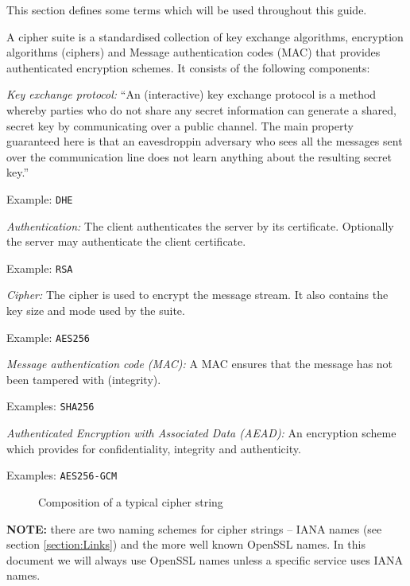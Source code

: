 
This section defines some terms which will be used throughout this guide.


A cipher suite is a standardised collection of key exchange algorithms, encryption 
algorithms (ciphers) and Message authentication codes (MAC) that provides authenticated 
encryption schemes. It consists of the following components:

\begin{description}

\item{\it Key exchange protocol:}
``An (interactive) key exchange protocol is a method whereby parties who do not 
share any secret information can generate a shared, secret key by communicating 
over a public channel. The main property guaranteed here is that an 
eavesdroppin adversary who sees all the messages sent over the communication 
line does not learn anything about the resulting secret key.'' \cite{katz2008introduction}

Example: \texttt{DHE}

\item{\it Authentication:}
The client authenticates the server by its certificate. Optionally the server 
may authenticate the client certificate.

Example: \texttt{RSA}

\item{\it Cipher:}
The cipher is used to encrypt the message stream. It also contains the key size
and mode used by the suite.

Example: \texttt{AES256}

\item{\it Message authentication code (MAC):}
A MAC ensures that the message has not been tampered with (integrity).

Examples: \texttt{SHA256}


\item{\it Authenticated Encryption with Associated Data (AEAD):}
An encryption scheme which provides for confidentiality, integrity and authenticity.

Examples: \texttt{AES256-GCM}



\begin{figure}[h]
\caption{Composition of a typical cipher string}
\end{figure}

\item {\textbf{NOTE:}} there are two naming schemes for cipher strings -- IANA names (see section \ref{section:Links}) and the more well known OpenSSL names. In this document we will always use OpenSSL names unless a specific service uses IANA names.

\end{description}
